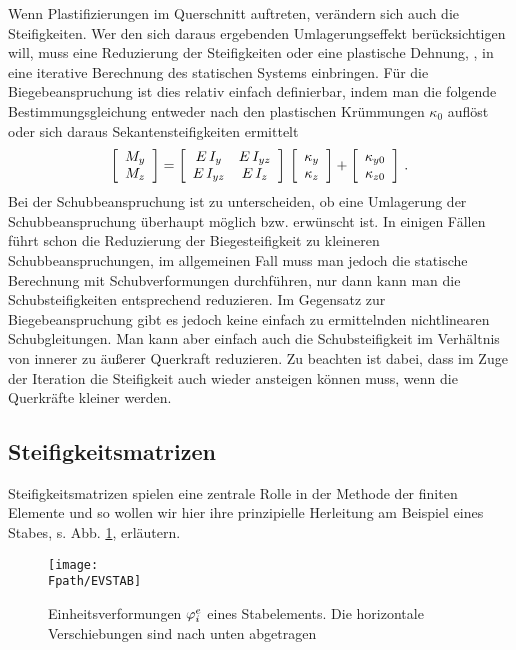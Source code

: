 Wenn Plastifizierungen im Querschnitt auftreten, ver\"{a}ndern sich auch die Steifigkeiten. Wer den sich daraus ergebenden Umlagerungseffekt ber\"{u}cksichtigen will, muss eine Reduzierung der Steifigkeiten oder eine plastische Dehnung, \cite{Brandes}, in eine iterative Berechnung des statischen Systems einbringen. F\"{u}r die Biegebeanspruchung ist dies relativ einfach definierbar, indem man die folgende Bestimmungsgleichung entweder nach den plastischen Kr\"{u}mmungen $\kappa_0$ aufl\"{o}st oder sich daraus Sekantensteifigkeiten ermittelt
\begin{align}
\left[\barr{c} M_y \\ M_z \earr \right] = \left[\barr {c c} E\,I_y & E\,I_{yz} \\
E\,I_{yz} & E\,I_z \earr \right] \,\left[\barr{c} \kappa_y \\ \kappa_z \earr \right] +
\left[\barr{c} \kappa_{y0} \\ \kappa_{z0} \earr \right]\,.
\end{align}
Bei der Schubbeanspruchung ist zu unterscheiden, ob eine Umlagerung der Schubbeanspruchung \"{u}berhaupt m\"{o}glich bzw. erw\"{u}nscht ist. In einigen F\"{a}llen f\"{u}hrt schon die Reduzierung der Biegesteifigkeit zu kleineren Schubbeanspruchungen, im allgemeinen Fall muss man jedoch die statische Berechnung mit Schubverformungen durchf\"{u}hren, nur dann kann man die Schubsteifigkeiten entsprechend reduzieren. Im Gegensatz zur Biegebeanspruchung gibt es jedoch keine einfach zu ermittelnden nichtlinearen Schubgleitungen. Man kann aber einfach auch die Schubsteifigkeit im Verh\"{a}ltnis von innerer zu \"{a}u{\ss}erer Querkraft reduzieren. Zu beachten ist dabei, dass im Zuge der Iteration die Steifigkeit auch wieder ansteigen k\"{o}nnen muss, wenn die Querkr\"{a}fte kleiner werden.


{\textcolor{sectionTitleBlue}{\section{Steifigkeitsmatrizen}}}

Steifigkeitsmatrizen spielen eine zentrale Rolle in der Methode der finiten Elemente und so wollen wir hier ihre prinzipielle Herleitung am Beispiel eines Stabes, s. Abb. \ref{EvStab}, erl\"{a}utern.
\begin{figure}[tbp] \centering
\if {} \sidecaption \fi
\texttt{[image: \\Fpath/EVSTAB]}
\caption{Einheitsverformungen $\Np_i^e$ eines Stabelements. Die horizontale Verschiebungen sind nach unten
abgetragen}
\label{EvStab}%
\end{figure}%

